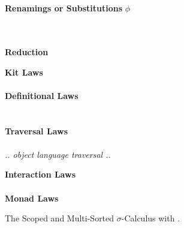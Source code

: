 \documentclass[screen,nonacm]{acmart}
\begin{document}
\begin{figure}[t]
\begin{minipage}[t]{0.48\textwidth}
            \EVarTrmTy{}\\
            \vspace{0.5em}
            \EVarTrmApp{}\\
            \vspace{0.5em}
            \textbf{Renamings or Substitutions} $ϕ$\\
            \EPrimsTy{}\\
            \vspace{0.5em}
            \EPrims{}\\
            \vspace{0.5em}
      \end{minipage}

      {\raggedright \vspace{2.0em} \textbf{\Large Reduction} \par}
      \vspace{1.5em}
      \begin{minipage}[t]{0.40\textwidth}
            \raggedright
            \textbf{Kit Laws}\\
            \ETypeLevel{}\\
            \vspace{0.5em}
            \textbf{Definitional Laws}\\
            \vspace{0.5em}
            \EDefLawTy{}\\
            \vspace{0.5em}
            \EDefLaw{}\\
            \vspace{0.5em}
            \textbf{Traversal Laws}\\
            \ETravL{}\\
            \emph{.. object language traversal ..}

      \end{minipage}
      \hfill
      \begin{minipage}[t]{0.56\textwidth}
            \raggedright
            \textbf{Interaction Laws}\\
            \EInteraction{}\\
            \vspace{0.5em}
            \textbf{Monad Laws}\\
            \EMonad{}
      \end{minipage}
      \caption{The Scoped and Multi-Sorted $\sigma$-Calculus with .}
      \label{fig:ags:fin}
\end{figure}
\end{document}
